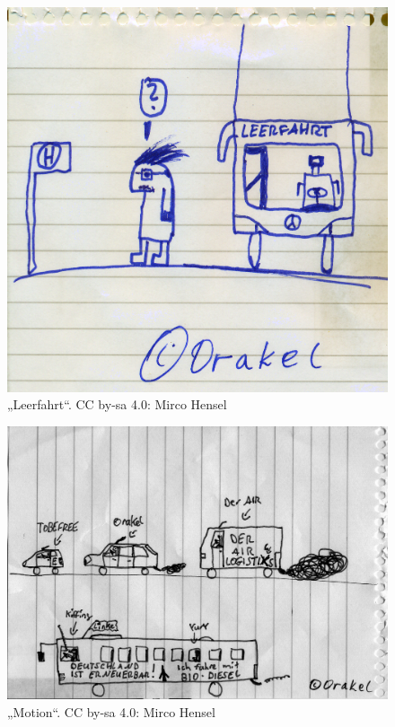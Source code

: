 \begin{figure}[p]
	\includegraphics[width=\linewidth]{include-main-orakel-leerfahrt.png}
	\caption{„Leerfahrt“. CC by-sa 4.0: Mirco Hensel}
\end{figure}

\begin{figure}[p]
	\includegraphics[width=\linewidth]{include-main-orakel-motion.png}
	\caption{„Motion“. CC by-sa 4.0: Mirco Hensel}
\end{figure}


